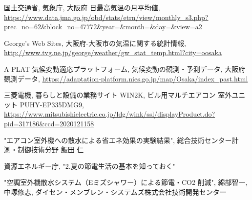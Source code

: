 \documentclass[a4j,fleqn,dvipdfmx,uplatex]{jsarticle}
\begin{document}
\begin{thebibliography}{99}
国土交通省, 気象庁, 大阪府 日最高気温の月平均値, 
\url{https://www.data.jma.go.jp/obd/stats/etrn/view/monthly_s3.php?prec_no=62&block_no=47772&year=&month=&day=&view=a2}\vspace{2mm}

George's Web Sites, 大阪府-大阪市の気温に関する統計情報, 
\url{http://www.tvg.ne.jp/george/weather/gw_stat_temp.html?city=oosaka}\vspace{2mm}

A-PLAT 気候変動適応プラットフォーム, 気候変動の観測・予測データ, 大阪府観測データ, 
\url{https://adaptation-platform.nies.go.jp/map/Osaka/index_past.html}\vspace{2mm}

三菱電機, 暮らしと設備の業務サイト WIN2K, ビル用マルチエアコン 室外ユニット PUHY-EP335DMG9, 
\url{https://www.mitsubishielectric.co.jp/ldg/wink/ssl/displayProduct.do?pid=317186&ccd=2020121158}\vspace{2mm}



"エアコン室外機への散水による省エネ効果の実験結果", 
総合技術センター計測・制御技術分野 飯田 仁\vspace{2mm}

資源エネルギー庁, "2.夏の節電生活の基本を知っておく"\vspace{2mm}

"空調室外機散水システム（Eミズシャワー）による節電・CO2 削減", 
綿部智一, 中塚修志, 
ダイセン・メンブレン・システムズ株式会社技術開発センター\vspace{2mm}

\end{thebibliography}
%
%
%
\end{document}
